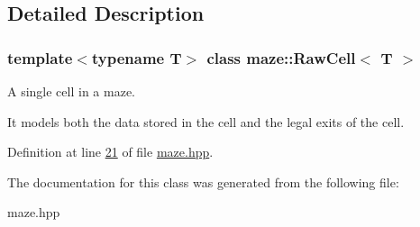 \subsection{Detailed Description}
\subsubsection*{template$<$typename T$>$\newline
class maze\+::\+Raw\+Cell$<$ T $>$}

A single cell in a maze. 

It models both the data stored in the cell and the legal exits of the cell. 

Definition at line \hyperlink{maze_8hpp_source_l00021}{21} of file \hyperlink{maze_8hpp_source}{maze.\+hpp}.



The documentation for this class was generated from the following file\+:\begin{DoxyCompactItemize}
\item 
maze.\+hpp\end{DoxyCompactItemize}
